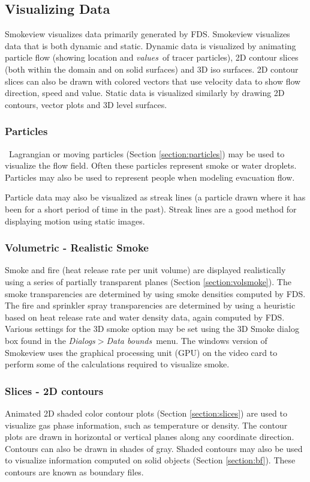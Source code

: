 \documentclass[11pt,twoside]{book}
\begin{document}
\subsection{Visualizing Data}

Smokeview visualizes data primarily generated by FDS.
Smokeview visualizes data that is both dynamic and static.  Dynamic
data is visualized by animating particle flow (showing
location and {\em values}\ of tracer particles), 2D contour
slices (both within the domain and on solid surfaces) and
3D iso surfaces.  2D contour slices can also be drawn
with colored vectors that use velocity data to show flow
direction, speed and value. Static data is visualized
similarly by drawing 2D contours, vector plots and 3D level
surfaces.

\subsubsection{Particles}\ Lagrangian or moving particles
(Section \ref{section:particles}) may be
used to visualize the flow field. Often these particles represent
smoke or water droplets.  Particles may also be used to represent
people when modeling evacuation flow.

Particle data may also be visualized as streak lines (a particle
drawn where it has been for a short period of time in the past).
Streak lines are a good method for displaying motion using static
images.

\subsubsection{Volumetric - Realistic Smoke}
Smoke and fire (heat release rate per unit volume) are displayed
realistically using a series of partially transparent planes
(Section \ref{section:volsmoke}). The smoke transparencies are
determined by using smoke densities computed by FDS.  The fire and
sprinkler spray transparencies are determined by using a heuristic
based on heat release rate and water density data, again computed
by FDS. Various settings for the 3D smoke option may be set using
the 3D Smoke dialog box found in the {\em Dialogs$>$Data bounds}\ menu.
The windows version of Smokeview uses the graphical processing
unit (GPU) on the video card to perform some of the calculations
required to visualize smoke.

\subsubsection{Slices - 2D contours}
Animated 2D shaded color contour plots (Section
\ref{section:slices}) are used to visualize gas phase information,
such as temperature or density. The contour plots are drawn in
horizontal or vertical planes along any coordinate direction.
Contours can also be drawn in shades of gray.
Shaded contours may also be used to visualize information
computed on solid objects (Section \ref{section:bf}).  These contours are known as boundary files.
\end{document}
